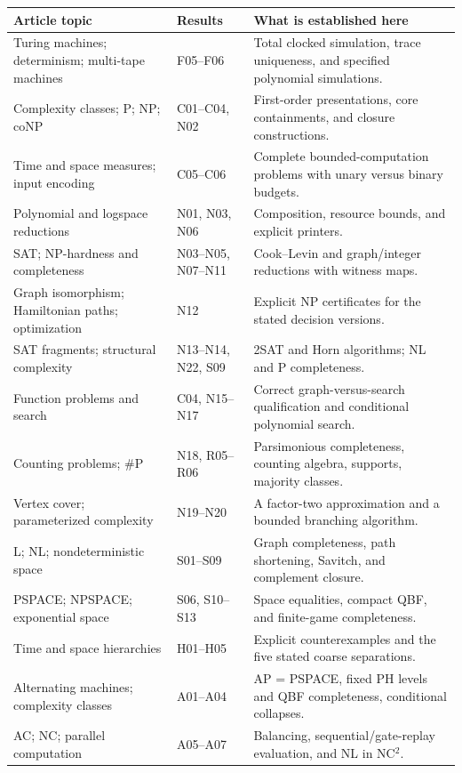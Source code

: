 \begin{longtable}{p{}p{}p{}}
\toprule
Article topic & Results & What is established here \\
\midrule\endhead
Turing machines; determinism; multi-tape machines & F05--F06 & Total clocked simulation, trace uniqueness, and specified polynomial simulations. \\
Complexity classes; P; NP; coNP & C01--C04, N02 & First-order presentations, core containments, and closure constructions. \\
Time and space measures; input encoding & C05--C06 & Complete bounded-computation problems with unary versus binary budgets. \\
Polynomial and logspace reductions & N01, N03, N06 & Composition, resource bounds, and explicit printers. \\
SAT; NP-hardness and completeness & N03--N05, N07--N11 & Cook--Levin and graph/integer reductions with witness maps. \\
Graph isomorphism; Hamiltonian paths; optimization & N12 & Explicit NP certificates for the stated decision versions. \\
SAT fragments; structural complexity & N13--N14, N22, S09 & 2SAT and Horn algorithms; NL and P completeness. \\
Function problems and search & C04, N15--N17 & Correct graph-versus-search qualification and conditional polynomial search. \\
Counting problems; \#P & N18, R05--R06 & Parsimonious completeness, counting algebra, supports, majority classes. \\
Vertex cover; parameterized complexity & N19--N20 & A factor-two approximation and a bounded branching algorithm. \\
L; NL; nondeterministic space & S01--S09 & Graph completeness, path shortening, Savitch, and complement closure. \\
PSPACE; NPSPACE; exponential space & S06, S10--S13 & Space equalities, compact QBF, and finite-game completeness. \\
Time and space hierarchies & H01--H05 & Explicit counterexamples and the five stated coarse separations. \\
Alternating machines; complexity classes & A01--A04 & AP = PSPACE, fixed PH levels and QBF completeness, conditional collapses. \\
AC; NC; parallel computation & A05--A07 & Balancing, sequential/gate-replay evaluation, and NL in NC$^2$. \\

\end{longtable}
